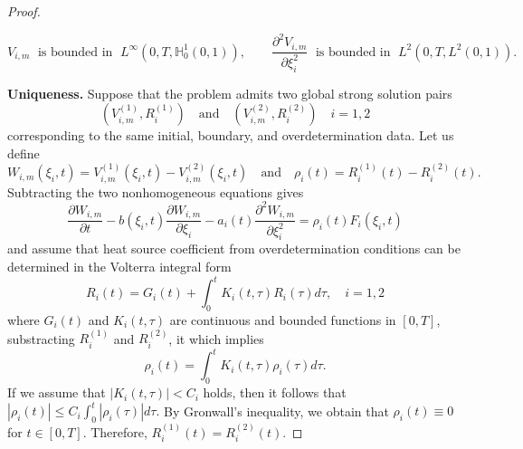 \documentclass[10pt,a4paper]{amsart}
\begin{document}
\begin{proof}
\begin{itemize}
        $$V_{i,m}\;\text{ is bounded in }\; L^{\infty}(0,T,\mathbb{H}_0^1(0,1)),\quad\quad \frac{\partial^2V_{i,m}}{\partial\xi_i^2}\;\text{ is bounded in }\; L^2(0,T,L^2(0,1)).$$
    \end{itemize}
    \textbf{Uniqueness.} Suppose that the problem admits two global strong solution pairs
    $$(V_{i,m}^{(1)},R_i^{(1)})\quad \text{and}\quad (V_{i,m}^{(2)},R_i^{(2)})\quad i=1,2$$
    corresponding to the same initial, boundary, and overdetermination data. Let us define
    $$W_{i,m}(\xi_i,t)=V_{i,m}^{(1)}(\xi_i,t)-V_{i,m}^{(2)}(\xi_i,t)\quad\text{and}\quad \rho_i(t)=R_i^{(1)}(t)-R_i^{(2)}(t).$$
    Subtracting the two nonhomogeneous equations gives
    \begin{equation}\label{eq63}
        \frac{\partial W_{i,m}}{\partial t}-b(\xi_i,t)\frac{\partial W_{i,m}}{\partial \xi_i}-a_i(t)\frac{\partial^2 W_{i,m}}{\partial\xi_i^2}=\rho_i(t)F_i(\xi_i,t)
    \end{equation}
    and assume that heat source coefficient from overdetermination conditions can be determined in the Volterra integral form
    $$R_i(t)=G_i(t)+\int_0^tK_i(t,\tau)R_i(\tau)d\tau,\quad i=1,2$$ 
    where $G_i(t)$ and $K_i(t,\tau)$ are continuous and bounded functions in $[0,T]$, substracting $R_i^{(1)}$ and $R_i^{(2)}$, it which implies
    \begin{equation}\label{eq64}
        \rho_i(t)=\int_0^t K_i(t,\tau)\rho_i(\tau)d\tau.
    \end{equation}
    If we assume that $|K_i(t,\tau)|<C_i$ holds, then it follows that $|\rho_i(t)|\leq C_i\int_0^t |\rho_i(\tau)|d\tau.$
    By Gronwall's inequality, we obtain that $\rho_i(t)\equiv 0$ for $t\in[0,T]$. Therefore, $R_i^{(1)}(t)=R_i^{(2)}(t)$.
    

\end{proof}
\end{document}
